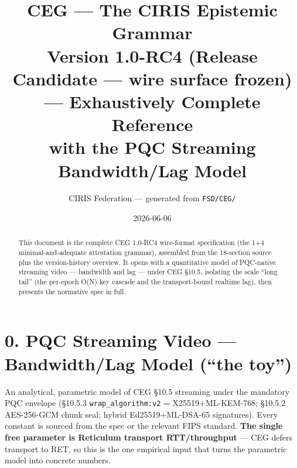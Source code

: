 \documentclass[10pt]{article}
\title{\textbf{CEG --- The CIRIS Epistemic Grammar}\\[4pt]\large Version 1.0-RC4 (Release Candidate --- wire surface frozen) --- Exhaustively Complete Reference\\[2pt]\normalsize with the PQC Streaming Bandwidth/Lag Model}
\author{CIRIS Federation --- generated from \texttt{FSD/CEG/}}
\date{2026-06-06}
\begin{document}
\maketitle
\begin{abstract}\noindent
This document is the complete CEG 1.0-RC4 wire-format specification (the 1+4
minimal-and-adequate attestation grammar), assembled from the 18-section source
plus the version-history overview. It opens with a quantitative model of
PQC-native streaming video --- bandwidth and lag --- under CEG \S10.5, isolating
the scale ``long tail'' (the per-epoch O(N) key cascade and the transport-bound
realtime lag), then presents the normative spec in full.
\end{abstract}
\tableofcontents
\clearpage


\section*{0. PQC Streaming Video --- Bandwidth/Lag Model (``the toy'')}

An analytical, parametric model of CEG \S10.5 streaming under the mandatory PQC
envelope (\S10.5.3 \texttt{wrap\_algorithm:v2} = X25519+ML-KEM-768; \S10.5.2
AES-256-GCM chunk seal; hybrid Ed25519+ML-DSA-65 signatures). Every constant is
sourced from the spec or the relevant FIPS standard. \textbf{The single free
parameter is Reticulum transport RTT/throughput} --- CEG defers transport to RET,
so this is the one empirical input that turns the parametric model into concrete
numbers.
\end{document}
